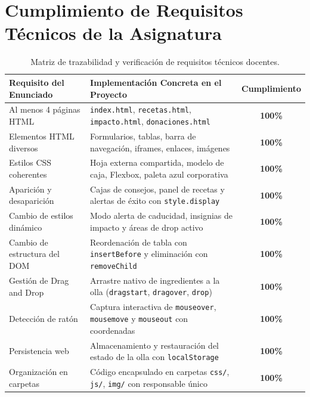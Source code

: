 \documentclass[11pt,a4paper]{article}
\begin{document}
\newpage

\section{Cumplimiento de Requisitos Técnicos de la Asignatura}

\begin{table}[h!]
\centering
\small
\begin{tabularx}{\textwidth}{l X c}
\toprule
\textbf{Requisito del Enunciado} & \textbf{Implementación Concreta en el Proyecto} & \textbf{Cumplimiento} \\
\midrule
Al menos 4 páginas HTML & \texttt{index.html}, \texttt{recetas.html}, \texttt{impacto.html}, \texttt{donaciones.html} & \textbf{100\%} \\
Elementos HTML diversos & Formularios, tablas, barra de navegación, iframes, enlaces, imágenes & \textbf{100\%} \\
Estilos CSS coherentes & Hoja externa compartida, modelo de caja, Flexbox, paleta azul corporativa & \textbf{100\%} \\
Aparición y desaparición & Cajas de consejos, panel de recetas y alertas de éxito con \texttt{style.display} & \textbf{100\%} \\
Cambio de estilos dinámico & Modo alerta de caducidad, insignias de impacto y áreas de drop activo & \textbf{100\%} \\
Cambio de estructura del DOM & Reordenación de tabla con \texttt{insertBefore} y eliminación con \texttt{removeChild} & \textbf{100\%} \\
Gestión de Drag and Drop & Arrastre nativo de ingredientes a la olla (\texttt{dragstart}, \texttt{dragover}, \texttt{drop}) & \textbf{100\%} \\
Detección de ratón & Captura interactiva de \texttt{mouseover}, \texttt{mousemove} y \texttt{mouseout} con coordenadas & \textbf{100\%} \\
Persistencia web & Almacenamiento y restauración del estado de la olla con \texttt{localStorage} & \textbf{100\%} \\
Organización en carpetas & Código encapsulado en carpetas \texttt{css/}, \texttt{js/}, \texttt{img/} con responsable único & \textbf{100\%} \\
\bottomrule
\end{tabularx}
\caption{Matriz de trazabilidad y verificación de requisitos técnicos docentes.}
\label{tab:requisitos}
\end{table}
\end{document}
